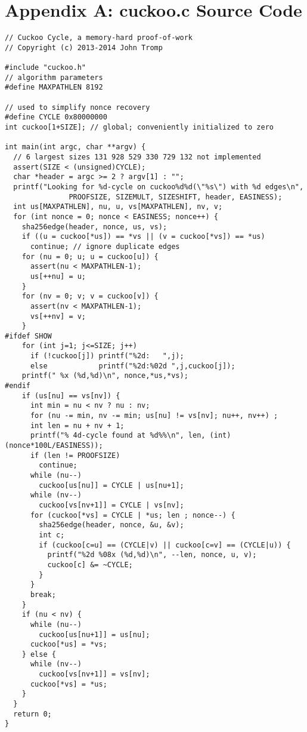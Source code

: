 \documentclass[11pt, oneside]{article}
\begin{document}
\section{Appendix A: cuckoo.c Source Code}
\footnotesize
\begin{verbatim}
// Cuckoo Cycle, a memory-hard proof-of-work
// Copyright (c) 2013-2014 John Tromp

#include "cuckoo.h"
// algorithm parameters
#define MAXPATHLEN 8192

// used to simplify nonce recovery
#define CYCLE 0x80000000
int cuckoo[1+SIZE]; // global; conveniently initialized to zero

int main(int argc, char **argv) {
  // 6 largest sizes 131 928 529 330 729 132 not implemented
  assert(SIZE < (unsigned)CYCLE);
  char *header = argc >= 2 ? argv[1] : "";
  printf("Looking for %d-cycle on cuckoo%d%d(\"%s\") with %d edges\n",
               PROOFSIZE, SIZEMULT, SIZESHIFT, header, EASINESS);
  int us[MAXPATHLEN], nu, u, vs[MAXPATHLEN], nv, v; 
  for (int nonce = 0; nonce < EASINESS; nonce++) {
    sha256edge(header, nonce, us, vs);
    if ((u = cuckoo[*us]) == *vs || (v = cuckoo[*vs]) == *us)
      continue; // ignore duplicate edges
    for (nu = 0; u; u = cuckoo[u]) {
      assert(nu < MAXPATHLEN-1);
      us[++nu] = u;
    }
    for (nv = 0; v; v = cuckoo[v]) {
      assert(nv < MAXPATHLEN-1);
      vs[++nv] = v;
    }
#ifdef SHOW
    for (int j=1; j<=SIZE; j++)
      if (!cuckoo[j]) printf("%2d:   ",j);
      else            printf("%2d:%02d ",j,cuckoo[j]);
    printf(" %x (%d,%d)\n", nonce,*us,*vs);
#endif
    if (us[nu] == vs[nv]) {
      int min = nu < nv ? nu : nv;
      for (nu -= min, nv -= min; us[nu] != vs[nv]; nu++, nv++) ;
      int len = nu + nv + 1;
      printf("% 4d-cycle found at %d%%\n", len, (int)(nonce*100L/EASINESS));
      if (len != PROOFSIZE)
        continue;
      while (nu--)
        cuckoo[us[nu]] = CYCLE | us[nu+1];
      while (nv--)
        cuckoo[vs[nv+1]] = CYCLE | vs[nv];
      for (cuckoo[*vs] = CYCLE | *us; len ; nonce--) {
        sha256edge(header, nonce, &u, &v);
        int c;
        if (cuckoo[c=u] == (CYCLE|v) || cuckoo[c=v] == (CYCLE|u)) {
          printf("%2d %08x (%d,%d)\n", --len, nonce, u, v);
          cuckoo[c] &= ~CYCLE;
        }
      }
      break;
    }
    if (nu < nv) {
      while (nu--)
        cuckoo[us[nu+1]] = us[nu];
      cuckoo[*us] = *vs;
    } else {
      while (nv--)
        cuckoo[vs[nv+1]] = vs[nv];
      cuckoo[*vs] = *us;
    }
  }
  return 0;
}
\end{verbatim}
\end{document}
